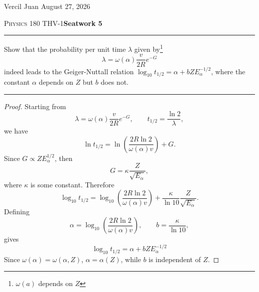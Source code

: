 \documentclass[9pt]{extarticle}
\begin{document}
	\noindent Vercil Juan \hfill August 27, 2026

	\noindent \textsc{Physics 180} THV-1\hfill \textbf{Seatwork 5}
	\vspace{1em}
	\hrule\vspace{5pt}
		Show that the probability per unit time $\lambda$ given by\footnote{$\omega(a)$ depends on $Z$}
		\begin{equation}
			\lambda = \omega(\alpha) \frac{v}{2R}e^{-G} 
		\end{equation}
		indeed leads to the Geiger-Nuttall relation $\log_{10}t_{1/2}=\alpha + bZE_{\alpha}^{-1/2}$,
		where the constant $\alpha$ depends on $Z$ but $b$ does not.
		\vspace{5pt}
	\hrule
		\vspace{5pt}
	\begin{proof}

		Starting from
		\[
			\lambda=\omega(\alpha)\frac{v}{2R}e^{-G},
			\qquad
			t_{1/2}=\frac{\ln2}{\lambda},
		\]
		we have
		\[
			\ln t_{1/2}
			=
			\ln\left(\frac{2R\ln2}{\omega(\alpha)v}\right)+G.
		\]
		Since $G\propto ZE_{\alpha}^{1/2}$, then
		\[
			G=\kappa\frac{Z}{\sqrt{E_\alpha}},
		\]
		where $\kappa$ is some constant. Therefore
		\[
			\log_{10}t_{1/2}
			=
			\log_{10}\left(\frac{2R\ln2}{\omega(\alpha)v}\right)
			+\frac{\kappa}{\ln10}\frac{Z}{\sqrt{E_\alpha}}.
		\]
		Defining
		\[
		\alpha=\log_{10}\left(\frac{2R\ln2}{\omega(\alpha)v}\right),
		\qquad
			b=\frac{\kappa}{\ln10},
		\]
		gives
		\begin{equation}
			\boxed{
				\log_{10}t_{1/2}
				=
				\alpha+bZE_\alpha^{-1/2}
			}
		\end{equation}
		Since \(\omega(\alpha)=\omega(\alpha,Z)\), \(\alpha=\alpha(Z)\), while \(b\) is independent of \(Z\).
	\end{proof}
\end{document}
